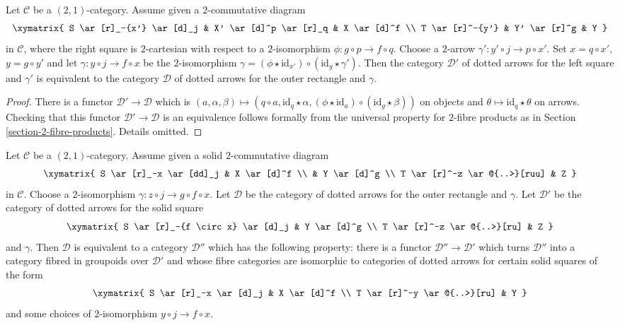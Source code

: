 \begin{lemma}
\label{lemma-cat-dotted-arrows-base-change}
Let $\mathcal{C}$ be a $(2,1)$-category. Assume given a $2$-commutative diagram
$$
\xymatrix{
S \ar[r]_-{x'} \ar[d]_j &
X' \ar[d]^p \ar[r]_q &
X \ar[d]^f \\
T \ar[r]^-{y'} &
Y' \ar[r]^g &
Y
}
$$
in $\mathcal{C}$, where the right square is $2$-cartesian 
with respect to a $2$-isomorphism $\phi \colon g \circ p \to f \circ q$. 
Choose a $2$-arrow
$\gamma' : y' \circ j \to p \circ x'$. Set
$x = q \circ x'$, $y = g \circ y'$ and let
$\gamma : y \circ j \to f \circ x$ be the $2$-isomorphism 
$\gamma = (\phi \star \text{id}_{x'}) \circ (\text{id}_g \star \gamma')$. 
Then the category $\mathcal{D}'$ of dotted arrows
for the left square and $\gamma'$ is equivalent to the category 
$\mathcal{D}$ of dotted
arrows for the outer rectangle and $\gamma$.
\end{lemma}

\begin{proof}
There is a functor $\mathcal{D}' \to \mathcal{D}$ which is 
$(a, \alpha, \beta) \mapsto (q \circ a, \text{id}_q \star \alpha,
(\phi \star \text{id}_a) \circ (\text{id}_g \star \beta))$ 
on objects and $\theta \mapsto \text{id}_q \star \theta$ on arrows. 
Checking that this functor $\mathcal{D}' \to \mathcal{D}$ is an equivalence 
follows formally from the universal property for $2$-fibre products 
as in Section \ref{section-2-fibre-products}. Details omitted.
\end{proof}

\begin{lemma}
\label{lemma-cat-dotted-arrows-composition}
Let $\mathcal{C}$ be a $(2,1)$-category. Assume given a solid $2$-commutative
diagram
$$
\xymatrix{
S \ar[r]_-x \ar[dd]_j & X \ar[d]^f \\
& Y \ar[d]^g \\
T \ar[r]^-z \ar@{..>}[ruu] & Z
}
$$
in $\mathcal{C}$. 
Choose a $2$-isomorphism $\gamma \colon z \circ j \to g \circ f \circ x$. 
Let $\mathcal{D}$ be the category of dotted arrows for 
the outer rectangle and $\gamma$. Let $\mathcal{D}'$ be 
the category of dotted arrows for the solid square
$$
\xymatrix{
S \ar[r]_-{f \circ x} \ar[d]_j & Y \ar[d]^g \\
T \ar[r]^-z \ar@{..>}[ru] & Z
}
$$
and $\gamma$. Then $\mathcal{D}$ is equivalent to 
a category $\mathcal{D}''$ which has the following property: 
there is a functor $\mathcal{D}'' \to \mathcal{D}'$ which turns $\mathcal{D}''$
into a category fibred in groupoids over $\mathcal{D}'$ and whose fibre
categories are isomorphic to categories of dotted arrows for certain
solid squares of the form
$$
\xymatrix{
S \ar[r]_-x \ar[d]_j & X \ar[d]^f \\
T \ar[r]^-y \ar@{..>}[ru] & Y
}
$$
and some choices of $2$-isomorphism $y \circ j \to f \circ x$.
\end{lemma}


